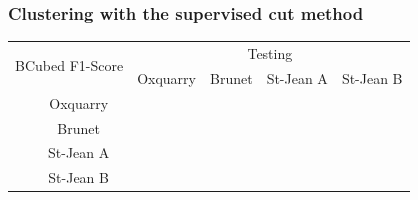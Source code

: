 \subsubsection{Clustering with the supervised cut method}




\begin{table}

  \begin{tabular}{l c c c c c}
    \multicolumn{2}{c}{\multirow{2}{*}{BCubed F1-Score}} & \multicolumn{4}{c}{Testing}\\
    \multicolumn{2}{c}{}                  & Oxquarry & Brunet & St-Jean A & St-Jean B \\
    \parbox[t]{2mm}{}  & Oxquarry  &          &        &           &           \\
                              & Brunet    &          &        &           &           \\
                              & St-Jean A &          &        &           &           \\
                              & St-Jean B &          &        &           &           \\
  \end{tabular}
\end{table}

